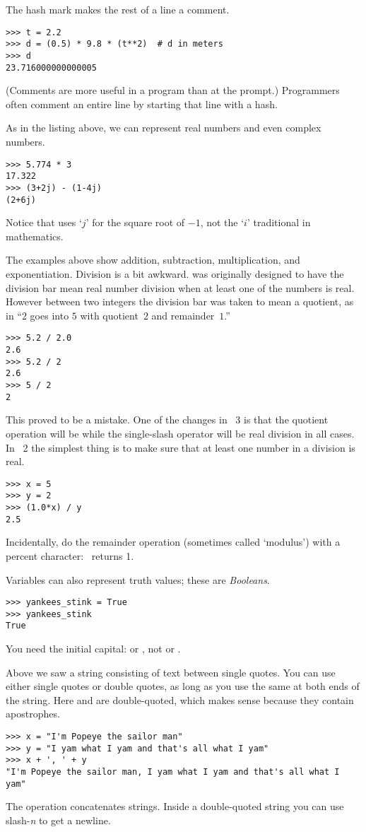 The hash mark \inlinecode{\#} makes the rest of a line a comment.
\begin{lstlisting}[style=python]
>>> t = 2.2
>>> d = (0.5) * 9.8 * (t**2)  # d in meters
>>> d
23.716000000000005
\end{lstlisting}
(Comments are more useful in a program than at the prompt.)
Programmers often comment an entire line by starting 
that line with a hash. 

As in the listing above, we can represent real 
numbers 
and even complex numbers.
\begin{lstlisting}[style=python]
>>> 5.774 * 3
17.322
>>> (3+2j) - (1-4j)
(2+6j)
\end{lstlisting}
Notice that \python{} uses `$j$' for the square
root of $-1$, not the `$i$' traditional in mathematics.

The examples above show addition, subtraction, multiplication, 
and exponentiation. 
Division is a bit awkward.
\python{} was originally designed to have the division bar
\inlinecode{/} mean real number division 
when at least one of the numbers is real.
However between two integers the division bar was taken to mean 
a quotient, as in ``$2$ goes into $5$ with quotient~$2$ and remainder~$1$.''
\begin{lstlisting}[style=python]
>>> 5.2 / 2.0
2.6
>>> 5.2 / 2
2.6
>>> 5 / 2
2
\end{lstlisting}
This proved to be a mistake. 
One of the changes in \python~3
is that the quotient operation will be \inlinecode{//}
while the single-slash operator will be real division in all cases.
In \python~2 the simplest thing is to make sure that at least one
number in a division is real.
\begin{lstlisting}[style=python]
>>> x = 5
>>> y = 2
>>> (1.0*x) / y
2.5
\end{lstlisting}
Incidentally, do the remainder operation (sometimes called `modulus')  
with a percent character:~ returns 1.

Variables can also represent truth values; these are \textit{Booleans}.
\begin{lstlisting}[style=python]
>>> yankees_stink = True
>>> yankees_stink
True
\end{lstlisting}
You need the initial capital:
or , not
or .
 
Above we saw a string consisting of text between single quotes.
You can use either single quotes or double quotes, as long as you use
the same at both ends of the string. 
Here  and 
are double-quoted, which makes sense because they contain apostrophes. 
\begin{lstlisting}[style=python]
>>> x = "I'm Popeye the sailor man"
>>> y = "I yam what I yam and that's all what I yam"
>>> x + ', ' + y
"I'm Popeye the sailor man, I yam what I yam and that's all what I yam"
\end{lstlisting}
The \inlinecode{+} operation concatenates strings.
Inside a double-quoted string you can use slash-\textit{n} \inlinecode{\\n} to
get a newline.

